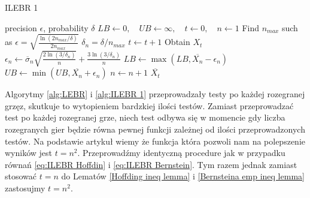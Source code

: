\documentclass[inzynierska]{pwr_wmat_praca_dyplomowa}
\theoremstyle{plain}
\numberwithin{theorem}{chapter}
\theoremstyle{definition}
\numberwithin{theorem}{chapter}
\begin{document}
	\begin{algorithm}[H]
		\caption{ILEBR 1}\label{alg:ILEBR 1}
		
		\begin{algorithmic}
			\Ensure precision $\epsilon$, probability $\delta$
			\State $LB \gets 0, \quad UB \gets \infty, \quad t \gets 0,\quad n \gets 1$
			\State Find $n_{max}$ such as $		\epsilon =  \sqrt{\frac{\ln(2n_{max}/\delta)}{2n_{max}}} $
			\Statex $\delta_n = \delta/n_{max}$
			\State $t \gets t + 1$
			\State Obtain $X_t$
			\State $\epsilon_n \gets \overline{\sigma}_n \sqrt{\frac{2\ln(3/\delta_n)}{n}} + \frac{3  \ln{(3 / \delta_n)}}{n}$ 
			\State $LB \gets \max(LB,  \overline{X_n} - \epsilon_n)$
			\State $UB \gets \min(UB,  \overline{X_n} + \epsilon_n)$
			\State $n \gets n + 1$
			\EndWhile
			\State \Return $ \overline{X_t}$		
		\end{algorithmic}
	\end{algorithm}
	Algorytmy \ref{alg:LEBR} i \ref{alg:ILEBR 1} przeprowadzały testy po każdej rozegranej grzęz, skutkuje to wytopieniem bardzkiej ilości testów. Zamiast przeprowadzać test po każdej rozegranej grze, niech test odbywa się w momencie gdy liczba rozegranych gier będzie równa pewnej funkcji zależnej od ilości przeprowadzonych testów. Na podstawie artykuł \cite{heidrich2011non} wiemy że funkcja która pozwoli nam na polepszenie wyników jest $t = n^2$. Przeprowadźmy identyczną procedure jak w przypadku równań \eqref{eq:ILEBR Hoffdin} i \eqref{eq:ILEBR Bernstein}. Tym razem jednak zamiast stosować $t = n$ do Lematów \ref{Hoffding ineq lemma} i \ref{Bernsteina emp ineq lemma}  zastosujmy $t = n^2$.
	
\end{document}
